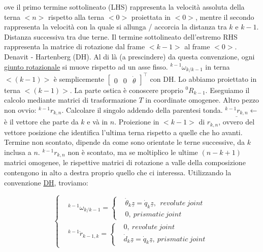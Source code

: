 ove il primo termine sottolineato (LHS) rappresenta la velocità assoluta della terna $<n>$ rispetto alla terna $<0>$ proiettata in $<0>$, mentre il secondo rappresenta la velocità con la quale si allunga / accorcia la distanza tra $k$ e $k-1$. Distanza successiva tra due terne. Il termine sottolineato dell'estremo RHS rappresenta la matrice di rotazione dal frame $<k-1>$ al frame $<0>$. Denavit - Hartenberg (DH). Al di là (a prescindere) da questa convenzione, ogni \underline{giunto rotazionale} si muove rispetto ad un asse fisso. $^{k-1}\omega_{k/k-1}$ in terna $<(k-1)>$ è semplicemente $\begin{bmatrix}0&0&\dot{\theta}\end{bmatrix}^\top$ con DH. Lo abbiamo proiettato in terna $<(k-1)>$. La parte ostica è conoscere proprio $^0R_{k-1}$. Eseguiamo il calcolo mediante matrici di trasformazione $T$ in coordinate omogenee. Altro pezzo non ovvio: $^{k-1}r_{k,n}$. Calcolare il singolo addendo della parentesi tonda. $\underline{^{k-1}r_{k,n}} \leftarrow$ è il vettore che parte da $k$ e và in $n$. Proiezione in $<k-1>$ di $r_{k,n}$, ovvero del vettore posizione che identifica l'ultima terna rispetto a quelle che ho avanti. Termine non scontato, dipende da come sono orientate le terne successive, da $k$ inclusa a $n$. $^{k-1}r_{k,n}$ non è scontato, ma se moltiplico le ultime $(n-k+1)$ matrici omogenee, le rispettive matrici di rotazione a valle della composizione contengono in alto a destra proprio quello che ci interessa. Utilizzando la convenzione \underline{DH}, troviamo:

\[
	\left\{
	\begin{aligned}
	&^{k-1}\omega_{k/k-1} =
	\left\{
	\begin{aligned}
	&\dot{\theta}_k\underline{z} = \dot{q}_k\underline{z},\ \ revolute\ joint\\
	&0,\ prismatic\ joint
	\end{aligned}
	\right.\\
	&^{k-1}\dot{r}_{k-1,k} =
	\left\{
	\begin{aligned}
	&0,\ revolute\ joint\\
	&\dot{d}_k\underline{z} = \dot{q}_k\underline{z},\ prismatic\ joint
	\end{aligned}
	\right.
	\end{aligned}
	\right.
\]

